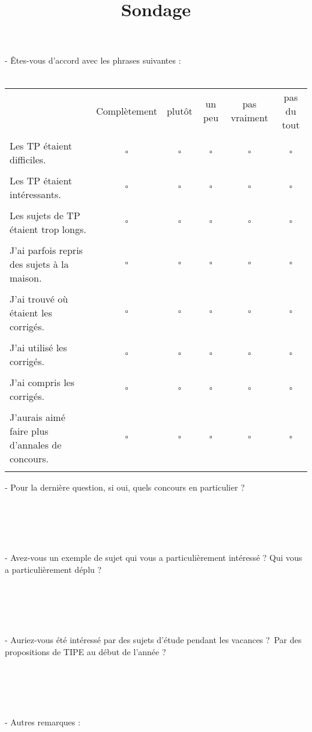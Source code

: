 \documentclass[10pt,a4paper]{article}
\begin{document}
\title{Sondage}
\date{}
\maketitle{}

- Êtes-vous d'accord avec les phrases suivantes :\\
\\
\begin{tabular}{ l c c c c c }
    & Complètement & plutôt & un peu & pas vraiment & pas du tout \\\\
   Les TP étaient difficiles. & $\square$ & $\square$ & $\square$ & $\square$ & $\square$ \\ \\
   Les TP étaient intéressants. & $\square$ & $\square$ & $\square$ & $\square$ & $\square$ \\ \\
   Les sujets de TP étaient trop longs. & $\square$ & $\square$ & $\square$ & $\square$ & $\square$ \\ \\
   J'ai parfois repris des sujets à la maison. & $\square$ & $\square$ & $\square$ & $\square$ & $\square$ \\ \\
   J'ai trouvé où étaient les corrigés. & $\square$ & $\square$ & $\square$ & $\square$ & $\square$ \\ \\
   J'ai utilisé les corrigés. & $\square$ & $\square$ & $\square$ & $\square$ & $\square$ \\ \\
   J'ai compris les corrigés. & $\square$ & $\square$ & $\square$ & $\square$ & $\square$ \\ \\
   J'aurais aimé faire plus d'annales de concours. & $\square$ & $\square$ & $\square$ & $\square$ & $\square$ \\ \\
\end{tabular}

- Pour la dernière question, si oui, quels concours en particulier ?
\\ \\ \\ \\ \\ \\

- Avez-vous un exemple de sujet qui vous a particulièrement intéressé ? Qui vous a particulièrement déplu ?
\\ \\ \\ \\ \\ \\

- Auriez-vous été intéressé par des sujets d'étude pendant les vacances ? Par des propositions de TIPE au début de l'année ?
\\ \\ \\ \\ \\ \\

- Autres remarques :
\end{document}
